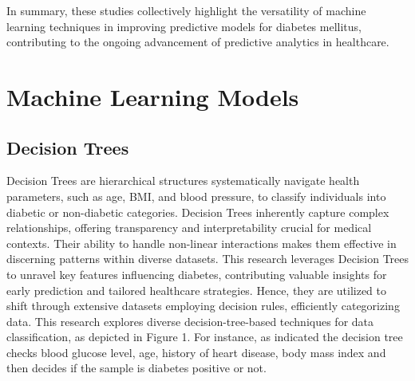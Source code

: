 \documentclass[11pt]{article}
\begin{document}
In summary, these studies collectively highlight the versatility of machine learning techniques in improving predictive models for diabetes mellitus, contributing to the ongoing advancement of predictive analytics in healthcare.

\section{Machine Learning Models}


\subsection{Decision Trees}
Decision Trees are hierarchical structures systematically navigate health parameters, such as age, BMI, and blood pressure, to classify individuals into diabetic or non-diabetic categories. Decision Trees inherently capture complex relationships, offering transparency and interpretability crucial for medical contexts. Their ability to handle non-linear interactions makes them effective in discerning patterns within diverse datasets. This research leverages Decision Trees to unravel key features influencing diabetes, contributing valuable insights for early prediction and tailored healthcare strategies.
Hence, they are utilized to shift through extensive datasets employing decision rules, efficiently categorizing data. This research explores diverse decision-tree-based techniques for data classification, as depicted in Figure 1. For instance, as indicated the decision tree checks blood glucose level, age, history of heart disease, body mass index and then decides if the sample is diabetes positive or not.
\end{document}
